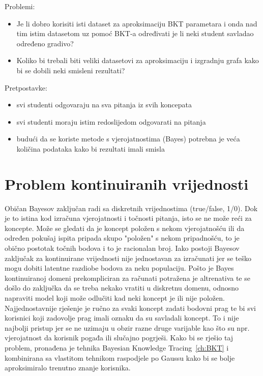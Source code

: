 \documentclass[times, utf8,projekt]{fer}
\begin{document}
	Problemi:
	\begin{itemize}
		\item Je li dobro korisiti isti dataset za aproksimaciju BKT parametara i onda nad tim istim datasetom uz pomoć BKT-a određivati je li neki student savladao određeno gradivo?
		\item 	Koliko bi trebali biti veliki datasetovi za aproksimaciju i izgradnju grafa kako bi se dobili neki smisleni rezultati?\newline
	\end{itemize}
	Pretpostavke:
	\begin{itemize}
		\item svi studenti odgovaraju na sva pitanja iz svih koncepata
		\item svi studenti moraju istim redoslijedom odgovarati na pitanja
		\item budući da se koriste metode s vjerojatnostima (Bayes) potrebna je veća količina podataka kako bi rezultati imali smisla
	\end{itemize}

	\section{Problem kontinuiranih vrijednosti}
		Običan Bayesov zaključan radi sa diskretnih vrijednostima (true/false, 1/0). Dok je to istina kod izračuna vjerojatnosti i točnosti pitanja, isto se ne može reći za koncepte. Može se gledati da je koncept položen s nekom vjerojatnošću ili da određen pokušaj ispita pripada skupo "položen" s nekom pripadnošću, to je obično postotak točnih bodova i to je racionalan broj. Iako postoji Bayesov zaključak za kontinuirane vrijednosti nije jednostavan za izračunati jer se teško mogu dobiti latentne razdiobe bodova za neku populaciju. Pošto je Bayes kontinuiranoj domeni prekompliciran za računati potražena je altrenativa te se došlo do zaključka da se treba nekako vratiti u diskretnu domenu, odnosno napraviti model koji može odlučiti kad neki koncept je ili nije položen.\newline
		Najjednostavnije rješenje je ručno za svaki koncept zadati bodovni prag te bi svi korisnici koji zadovolje prag imali oznaku da su savladali koncept. To i nije najbolji pristup jer se ne uzimaju u obzir razne druge varijable kao što su npr. vjerojatnost da korisnik pogađa ili slučajno pogrješi.\newline
		Kako bi se rješio taj problem, pronađena je tehnika Bayesian Knowledge Tracing~\ref{ch:BKT} i kombinirana sa vlastitom tehnikom raspodjele po Gaussu kako bi se bolje aproksimiralo trenutno znanje korisnika.
\end{document}
